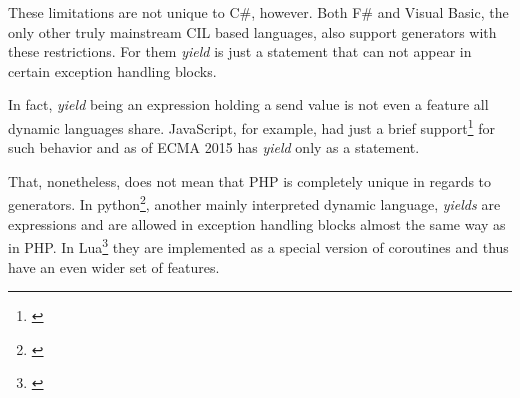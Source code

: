 These limitations are not unique to C\#, however. Both F\# and Visual Basic, the only other truly mainstream CIL based languages, also support generators with these restrictions. For them \emph{yield} is just a statement that can not appear in certain exception handling blocks.

In fact, \emph{yield} being an expression holding a send value is not even a feature all dynamic languages share. JavaScript, for example, had just a brief support\footnote{\citep{ECMAYield}} for such behavior and as of ECMA 2015 has \emph{yield} only as a statement.

That, nonetheless, does not mean that PHP is completely unique in regards to generators. In python\footnote{\citep{PythonYield}}, another mainly interpreted dynamic language, \emph{yields} are expressions and are allowed in exception handling blocks almost the same way as in PHP. In Lua\footnote{\citep{LUAYield}} they are implemented as a special version of coroutines and thus have an even wider set of features.




